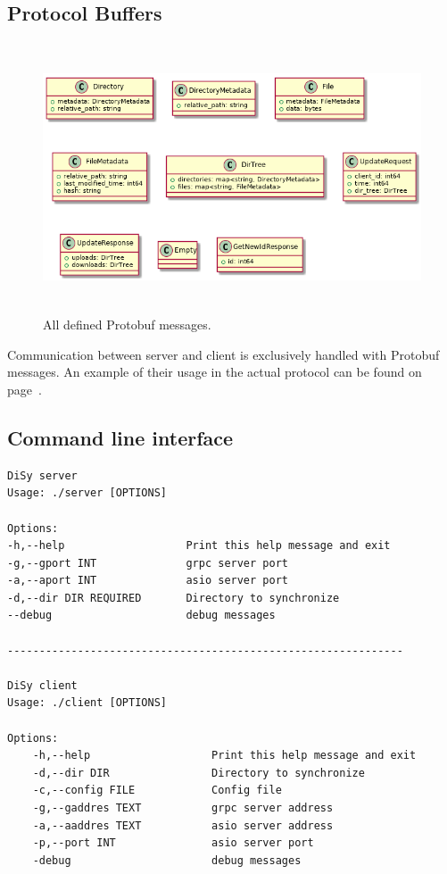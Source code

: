 \documentclass[a4paper]{article}
\begin{document}
\subsection{Protocol Buffers}
\begin{figure}[H]
\centering
\includegraphics[height=8cm]{protobufs}
\caption{All defined Protobuf messages.}
\end{figure}

Communication between server and client is exclusively handled with Protobuf messages. 
An example of their usage in the actual protocol can be found on page~\pageref{sec:phases}.
\newpage

\subsection{Command line interface}
\begin{verbatim}
DiSy server
Usage: ./server [OPTIONS]

Options:
-h,--help                   Print this help message and exit
-g,--gport INT              grpc server port
-a,--aport INT              asio server port
-d,--dir DIR REQUIRED       Directory to synchronize
--debug                     debug messages

--------------------------------------------------------------

DiSy client
Usage: ./client [OPTIONS]

Options:
    -h,--help                   Print this help message and exit
    -d,--dir DIR                Directory to synchronize
    -c,--config FILE            Config file
    -g,--gaddres TEXT           grpc server address
    -a,--aaddres TEXT           asio server address
    -p,--port INT               asio server port
    -debug                      debug messages
\end{verbatim}
\end{document}
